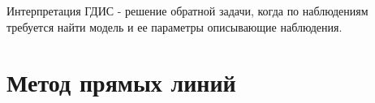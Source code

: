 Интерпретация ГДИС - решение обратной задачи, когда по наблюдениям требуется найти модель и ее параметры описывающие наблюдения.

\section{Метод прямых линий}